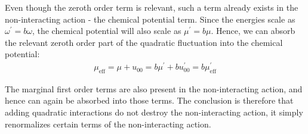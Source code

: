 \documentclass[12pt]{article}
\begin{document}
Even though the zeroth order term is relevant,  such a term already exists in the non-interacting action - the chemical potential term. Since the energies scale as \(\omega^\prime = b\omega\), the chemical potential will also scale as \(\mu^\prime = b \mu\). Hence, we can absorb the relevant zeroth order part of the quadratic fluctuation into the chemical potential:
\begin{gather}
	\mu_\text{eff} = \mu + u_{00} = b \mu^\prime + bu^\prime_{00} = b \mu_\text{eff}^\prime
\end{gather}

The marginal first order terms are also present in the non-interacting action, and hence can again be absorbed into those terms. The conclusion is therefore that adding quadratic interactions do not destroy the non-interacting action, it simply renormalizes certain terms of the non-interacting action.
\end{document}
